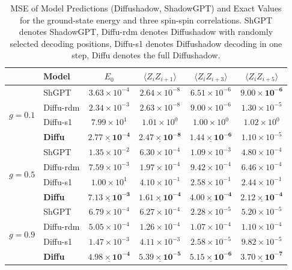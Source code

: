 \documentclass[pdflatex,sn-mathphys-num]{sn-jnl}%
\theoremstyle{thmstyleone}%
\theoremstyle{thmstyletwo}%
\theoremstyle{thmstylethree}%
\begin{document}
\begin{table}[htbp]
\centering
\setlength{\tabcolsep}{8pt}
\caption{MSE of Model Predictions (Diffushadow, ShadowGPT) and Exact Values for the ground-state energy and three spin-spin correlations. ShGPT denotes ShadowGPT, Diffu-rdm denotes Diffushadow with randomly selected decoding positions, Diffu-s1 denotes Diffushadow decoding in one step, Diffu denotes the full Diffushadow.}
\label{tab:mse_table}
\begin{tabular}{llcccc}
\hline
 &Model & $E_0$ & $\langle Z_iZ_{i+1}\rangle$ & $\langle Z_iZ_{i+3}\rangle$ & $\langle Z_iZ_{i+5}\rangle$\\
\hline
\multirow{4}{*}{$g=0.1$} 
& ShGPT      & $3.63{\times}10^{-4}$ & $2.64{\times}10^{-8}$ & $6.51{\times}10^{-6}$ & $\mathbf{9.00{\times}10^{-6}}$\\
& Diffu-rdm & $2.34{\times}10^{-3}$ & $2.63{\times}10^{-8}$ & $9.00{\times}10^{-6}$ & $1.30{\times}10^{-5}$\\
& Diffu-s1  & $7.99{\times}10^{1}$ & $1.01{\times}10^{0}$ & $1.00{\times}10^{0}$ & $1.02{\times}10^{0}$\\
& \textbf{Diffu}    & $\underline{\mathbf{2.77{\times}10^{-4}}}$ & $\underline{\mathbf{2.47{\times}10^{-8}}}$ & $\underline{\mathbf{1.44{\times}10^{-6}}}$ & $1.10{\times}10^{-5}$\\
\hline
\multirow{4}{*}{$g=0.5$} 
& ShGPT      & $1.35{\times}10^{-2}$ & $6.30{\times}10^{-4}$ & $1.09{\times}10^{-3}$ & $4.80{\times}10^{-4}$\\
& Diffu-rdm & $7.59{\times}10^{-3}$ & $1.97{\times}10^{-4}$ & $9.42{\times}10^{-4}$ & $6.46{\times}10^{-4}$\\
& Diffu-s1  & $1.00{\times}10^{1}$ & $4.10{\times}10^{-1}$ & $2.58{\times}10^{-1}$ & $2.44{\times}10^{-1}$\\
& \textbf{Diffu}    & $\underline{\mathbf{7.13{\times}10^{-3}}}$ & $\underline{\mathbf{1.61{\times}10^{-4}}}$ & $\underline{\mathbf{4.00{\times}10^{-4}}}$ & $\underline{\mathbf{2.12{\times}10^{-4}}}$\\
\hline
\multirow{4}{*}{$g=0.9$} 
& ShGPT      & $6.79{\times}10^{-4}$ & $6.27{\times}10^{-4}$ & $2.28{\times}10^{-5}$ & $5.20{\times}10^{-5}$\\
& Diffu-rdm & $5.05{\times}10^{-4}$ & $1.26{\times}10^{-4}$ & $1.07{\times}10^{-4}$ & $1.10{\times}10^{-4}$\\
& Diffu-s1  & $1.47{\times}10^{-3}$ & $4.11{\times}10^{-3}$ & $2.58{\times}10^{-5}$ & $9.82{\times}10^{-5}$\\
& \textbf{Diffu}    & $\underline{\mathbf{4.98{\times}10^{-4}}}$ & $\underline{\mathbf{5.39{\times}10^{-5}}}$ & $\underline{\mathbf{5.15{\times}10^{-6}}}$ & $\underline{\mathbf{3.70{\times}10^{-7}}}$\\
\hline
\end{tabular}
\end{table}
\end{document}

